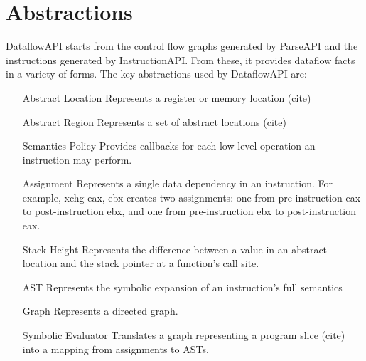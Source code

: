 \section{Abstractions}
\label{sec:abstractions}

DataflowAPI starts from the control flow graphs generated by ParseAPI and the instructions generated by InstructionAPI.
From these, it provides dataflow facts in a variety of forms. The key abstractions used by DataflowAPI are:

\begin{itemize}
\item[Abstract Location] Represents a register or memory location (cite)
\item[Abstract Region] Represents a set of abstract locations (cite)
\item[Semantics Policy] Provides callbacks for each low-level operation an instruction may perform.
\item[Assignment] Represents a single data dependency in an instruction. For example, xchg eax, ebx creates two assignments: one from pre-instruction eax to post-instruction ebx, and one from pre-instruction ebx to post-instruction eax.
\item[Stack Height] Represents the difference between a value in an abstract location and the stack pointer at a function's call site.
\item[AST] Represents the symbolic expansion of an instruction's full semantics
\item[Graph] Represents a directed graph.
\item[Symbolic Evaluator] Translates a graph representing a program slice (cite) into a mapping from assignments to ASTs.
\end{itemize}